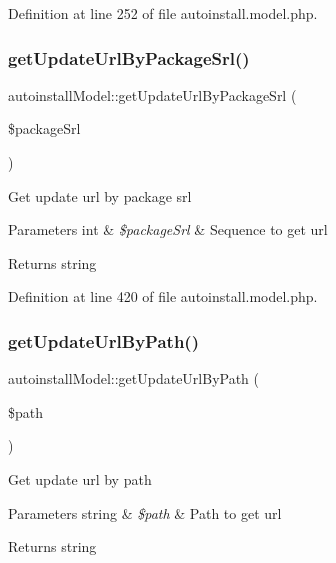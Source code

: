 Definition at line 252 of file autoinstall.\+model.\+php.

\hypertarget{classautoinstallModel_a20c447d210dff0edc286007b92ec881f}{}\label{classautoinstallModel_a20c447d210dff0edc286007b92ec881f} 
\subsubsection{\texorpdfstring{get\+Update\+Url\+By\+Package\+Srl()}{getUpdateUrlByPackageSrl()}}
{\footnotesize\ttfamily autoinstall\+Model\+::get\+Update\+Url\+By\+Package\+Srl (\begin{DoxyParamCaption}\item[{}]{\$package\+Srl }\end{DoxyParamCaption})}

Get update url by package srl


\begin{DoxyParams}[1]{Parameters}
int & {\em \$package\+Srl} & Sequence to get url \\
\hline
\end{DoxyParams}
\begin{DoxyReturn}{Returns}
string 
\end{DoxyReturn}


Definition at line 420 of file autoinstall.\+model.\+php.

\hypertarget{classautoinstallModel_a560f4c8850324ee4e0c3dc74573bc7d9}{}\label{classautoinstallModel_a560f4c8850324ee4e0c3dc74573bc7d9} 
\subsubsection{\texorpdfstring{get\+Update\+Url\+By\+Path()}{getUpdateUrlByPath()}}
{\footnotesize\ttfamily autoinstall\+Model\+::get\+Update\+Url\+By\+Path (\begin{DoxyParamCaption}\item[{}]{\$path }\end{DoxyParamCaption})}

Get update url by path


\begin{DoxyParams}[1]{Parameters}
string & {\em \$path} & Path to get url \\
\hline
\end{DoxyParams}
\begin{DoxyReturn}{Returns}
string 
\end{DoxyReturn}


